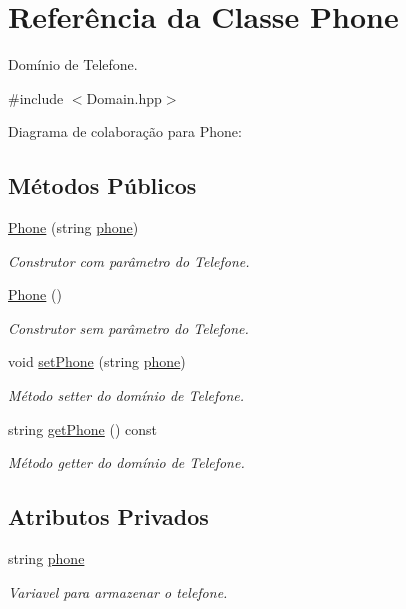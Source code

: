 \hypertarget{classPhone}{}\section{Referência da Classe Phone}
\label{classPhone}


Domínio de Telefone.  




{\ttfamily \#include $<$Domain.\+hpp$>$}



Diagrama de colaboração para Phone\+:
\subsection*{Métodos Públicos}
\begin{DoxyCompactItemize}
\item 
\hyperlink{classPhone_ae7187a98dfc653b8d9d8ee1893827e16}{Phone} (string \hyperlink{classPhone_a65aa255d594dacf2b1ae311c44cfcc63}{phone})
\begin{DoxyCompactList}\small\item\em Construtor com parâmetro do Telefone. \end{DoxyCompactList}\item 
\hyperlink{classPhone_ac5ec115fb10c28d4710170c52d2a0826}{Phone} ()
\begin{DoxyCompactList}\small\item\em Construtor sem parâmetro do Telefone. \end{DoxyCompactList}\item 
void \hyperlink{classPhone_ac3e4f7f8d293c0a619e2affe942417f6}{set\+Phone} (string \hyperlink{classPhone_a65aa255d594dacf2b1ae311c44cfcc63}{phone})
\begin{DoxyCompactList}\small\item\em Método setter do domínio de Telefone. \end{DoxyCompactList}\item 
string \hyperlink{classPhone_ae607ab2f5cb8728a096bc9daa2900e22}{get\+Phone} () const 
\begin{DoxyCompactList}\small\item\em Método getter do domínio de Telefone. \end{DoxyCompactList}\end{DoxyCompactItemize}
\subsection*{Atributos Privados}
\begin{DoxyCompactItemize}
\item 
string \hyperlink{classPhone_a65aa255d594dacf2b1ae311c44cfcc63}{phone}\hypertarget{classPhone_a65aa255d594dacf2b1ae311c44cfcc63}{}\label{classPhone_a65aa255d594dacf2b1ae311c44cfcc63}

\begin{DoxyCompactList}\small\item\em Variavel para armazenar o telefone. \end{DoxyCompactList}\end{DoxyCompactItemize}


